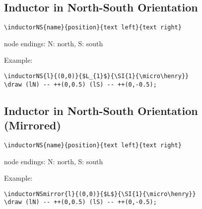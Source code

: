 \documentclass[parskip=full]{scrartcl}
\begin{document}
\subsection{Inductor in North-South Orientation}

\begin{verbatim}
\inductorNS{name}{position}{text left}{text right}
\end{verbatim}
node endings: N: north, S: south

Example:\\
\begin{minipage}{0.8\textwidth}
\begin{verbatim}
\inductorNS{l}{(0,0)}{$L_{1}$}{\SI{1}{\micro\henry}}
\draw (lN) -- ++(0,0.5) (lS) -- ++(0,-0.5);
\end{verbatim}
\end{minipage}
\begin{minipage}{0.19\textwidth}
\end{minipage}

\subsection{Inductor in North-South Orientation (Mirrored)}

\begin{verbatim}
\inductorNS{name}{position}{text left}{text right}
\end{verbatim}
node endings: N: north, S: south

Example:\\
\begin{minipage}{0.8\textwidth}
\begin{verbatim}
\inductorNSmirror{l}{(0,0)}{$L$}{\SI{1}{\micro\henry}}
\draw (lN) -- ++(0,0.5) (lS) -- ++(0,-0.5);
\end{verbatim}
\end{minipage}
\begin{minipage}{0.19\textwidth}
\end{minipage}
\end{document}
